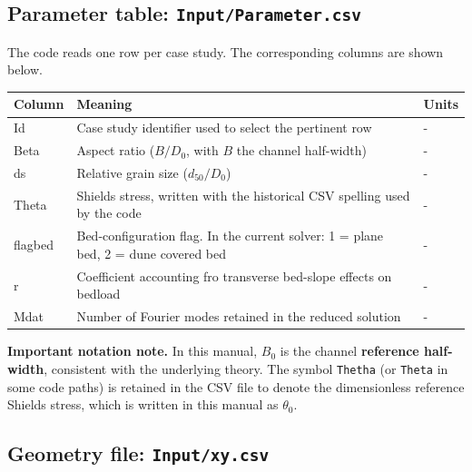 \documentclass[11pt,a4paper]{article}
\begin{document}
\subsection{Parameter table: \texttt{Input/Parameter.csv}}

The code reads one row per case study. The corresponding columns are shown below.

\begin{table}[H]
	\centering
	\begin{tabularx}{\textwidth}{>{\ttfamily}l >{\raggedright\arraybackslash}X >{\centering\arraybackslash}p{}}
	\toprule
	\textbf{Column} & \textbf{Meaning} & \textbf{Units} \\
	\midrule
	Id & Case study identifier used to select the pertinent row & - \\
	Beta & Aspect ratio ($B/D_0$, with $B$ the channel half-width) & - \\
	ds & Relative grain size ($d_{50}/D_0$) & - \\
	Theta & Shields stress, written with the historical CSV spelling used by the code & - \\
	flagbed & Bed-configuration flag. In the current solver: 1 = plane bed, 2 = dune covered bed & - \\
	r & Coefficient accounting fro transverse bed-slope effects on bedload & - \\
	Mdat & Number of Fourier modes retained in the reduced solution & - \\
	\bottomrule
	\end{tabularx}
	\label{TableParameters}
\end{table}

\begin{infobox}
	\textbf{Important notation note.} In this manual, $B_0$ is the channel \textbf{reference half-width}, consistent with the underlying theory. The symbol \texttt{Thetha} (or \texttt{Theta} in some code paths) is retained in the CSV file to denote the dimensionless reference Shields stress, which is written in this manual as $\theta_0$.
\end{infobox}

\subsection{Geometry file: \texttt{Input/xy.csv}}
\end{document}
